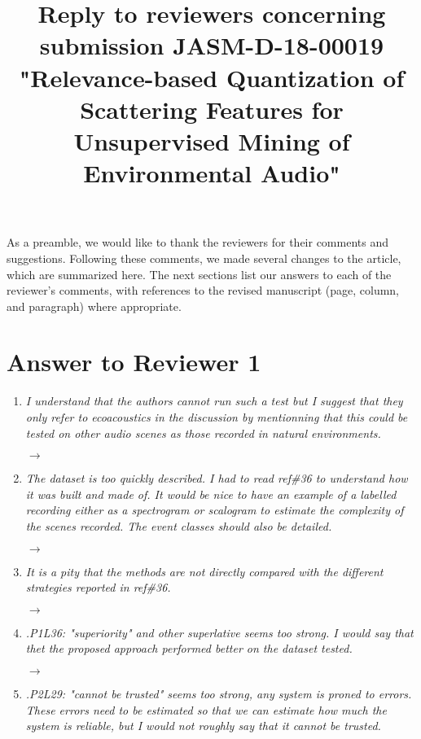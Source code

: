 \documentclass[10pt]{article}
\title{Reply to reviewers concerning submission JASM-D-18-00019 "Relevance-based Quantization of Scattering Features for Unsupervised Mining of Environmental Audio"}
\begin{document}
\maketitle

As a preamble, we would like to thank the reviewers for their comments and suggestions. Following these comments, we made several changes to the article, which are summarized here. The next sections list our answers to each of the reviewer’s comments, with references to the revised manuscript (page, column, and paragraph) where appropriate.

\section{Answer to Reviewer 1}

\begin{enumerate}

\item \emph{I understand that the authors cannot run such a test but I suggest that they only refer to ecoacoustics in the discussion by mentionning that this could be tested on other audio scenes as those recorded in natural environments.}

$\rightarrow$

\item \emph{The dataset is too quickly described. I had to read ref\#36 to understand how it was built and made of. It would be nice to have an example of a labelled recording either as a spectrogram or scalogram to estimate the complexity of the scenes recorded. The event classes should also be detailed.}

$\rightarrow$

\item \emph{It is a pity that the methods are not directly compared with the different strategies reported in ref\#36.}

$\rightarrow$

\item \emph{.P1L36: "superiority" and other superlative seems too strong. I would say that thet the proposed approach performed better on the dataset tested.}

$\rightarrow$

\item \emph{.P2L29: "cannot be trusted" seems too strong, any system is proned to errors. These errors need to be estimated so that we can estimate how much the system is reliable, but I would not roughly say that it cannot be trusted.}


\end{enumerate}
\end{document}
